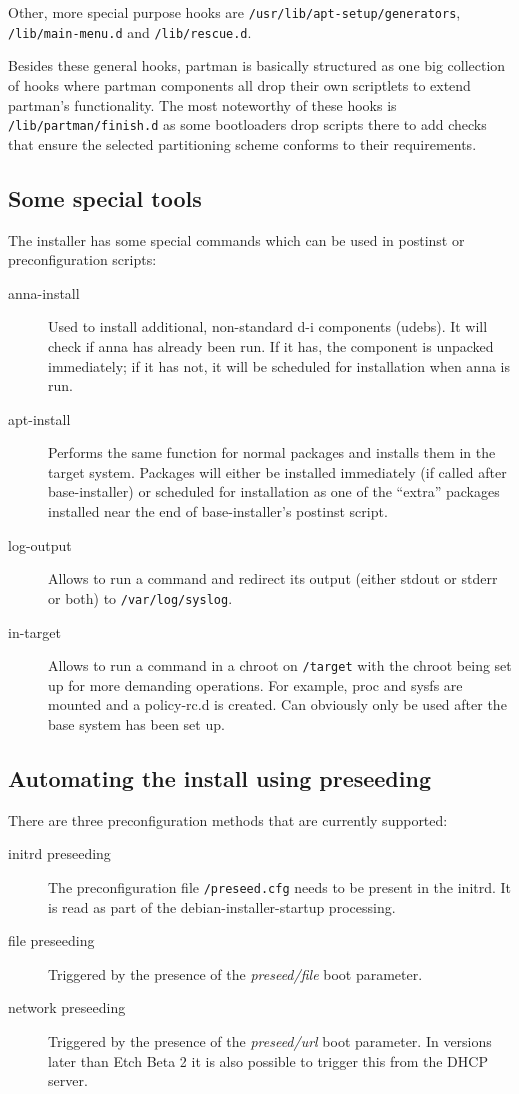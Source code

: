 \documentclass[a4paper,10pt]{article}
\begin{document}
Other, more special purpose hooks are \texttt{/usr/lib/apt-setup/generators}, \texttt{/lib/main-menu.d} and \texttt{/lib/rescue.d}. 

Besides these general hooks, partman is basically structured as one big collection of hooks where partman components all drop their own scriptlets to extend partman's functionality. The most noteworthy of these hooks is \texttt{/lib/partman/finish.d} as some bootloaders drop scripts there to add checks that ensure the selected partitioning scheme conforms to their requirements. 


\subsection{Some special tools}
The installer has some special commands which can be used in postinst or preconfiguration scripts: 

\begin{description}
\item[anna-install]
Used to install additional, non-standard d-i components (udebs). It will check if anna has already been run. If it has, the component is unpacked immediately; if it has not, it will be scheduled for installation when anna is run.
\item[apt-install]
Performs the same function for normal packages and installs them in the target system. Packages will either be installed immediately (if called after base-installer) or scheduled for installation as one of the “extra” packages installed near the end of base-installer's postinst script.
\item[log-output]
Allows to run a command and redirect its output (either stdout or stderr or both) to \texttt{/var/log/syslog}. 
\item[in-target]
Allows to run a command in a chroot on \texttt{/target} with the chroot being set up for more demanding operations. For example, proc and sysfs are mounted and a policy-rc.d is created. Can obviously only be used after the base system has been set up. 
\end{description}


\subsection{Automating the install using preseeding}
There are three preconfiguration methods that are currently supported: 

\begin{description}
\item[initrd preseeding]
The preconfiguration file \texttt{/preseed.cfg} needs to be present in the initrd. It is read as part of the debian-installer-startup processing. 
\item[file preseeding]
Triggered by the presence of the \textit{preseed/file} boot parameter.
\item[network preseeding]
Triggered by the presence of the \textit{preseed/url} boot parameter. In versions later than Etch Beta 2 it is also possible to trigger this from the DHCP server. 
\end{description}
\end{document}

